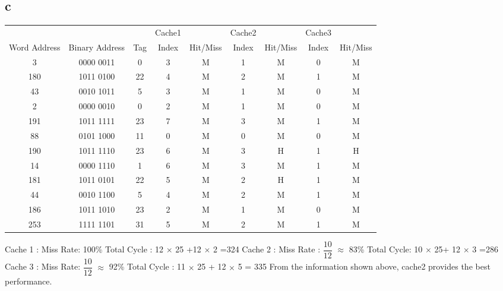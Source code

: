 \documentclass[]{article}
\begin{document}
\subsection*{c}
\begin{center}
	\begin{tabular}{ c c c c c c c c c   }
		&&&Cache1 &&Cache2&&Cache3\\
		Word Address & Binary Address & Tag & Index & Hit/Miss & Index &Hit/Miss &Index & Hit/Miss \\
		3 & 0000 0011 & 0 & 3 & M & 1 & M & 0 & M \\
		180 & 1011 0100 & 22 & 4 & M & 2 & M & 1 & M \\
		43 & 0010 1011 & 5 & 3 & M & 1 & M & 0 & M \\
		2 & 0000 0010 & 0 & 2 & M & 1 & M & 0 & M\\
		191 & 1011 1111 & 23 & 7 & M & 3 & M &1 & M \\ 
		88 & 0101 1000 & 11 & 0 & M & 0 & M & 0 & M \\ 
		190 & 1011 1110 & 23 & 6 & M & 3 & H & 1 & H\\ 
 		14 & 0000 1110 & 1 & 6 & M & 3 & M & 1 & M\\ 
		181 & 1011 0101 & 22 & 5 & M & 2 & H & 1 & M\\ 
		44 & 0010 1100 & 5 & 4 & M & 2 & M & 1 & M\\ 
		186 & 1011 1010 & 23 & 2 & M & 1 & M & 0 & M\\ 
		253 & 1111 1101 & 31 & 5 & M & 2 & M & 1 & M\\
	\end{tabular}
\end{center}
Cache 1 : \newline
Miss Rate: 100\% \newline
Total Cycle : 12 $\times$ 25 +12 $\times$ 2 =324 \newline
Cache 2 : \newline
Miss Rate : $\dfrac{10}{12}$ $\approx$ 83\%\newline
Total Cycle: 10 $\times$  25+ 12 $\times$ 3 =286\newline
Cache 3 : 
Miss Rate:  $\dfrac{10}{12}$ $\approx$ 92\% \newline
Total Cycle : 11 $\times$ 25 + 12 $\times$ 5 = 335\newline
From the information shown above, cache2 provides the best performance.
\end{document}
